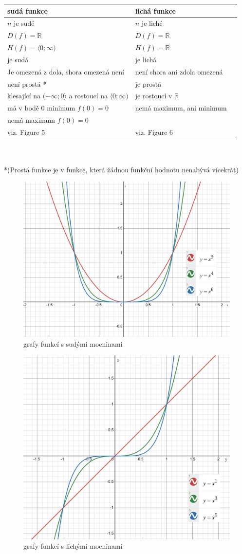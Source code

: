\begin{tabularx}{0.8\textwidth} { 
  | >{\centering\arraybackslash}X 
  | >{\centering\arraybackslash}X 
  | >{\raggedleft\arraybackslash}X | }
 \hline
  \textbf{sudá funkce} & \textbf{lichá funkce}\\
 \hline
 $n$ je sudé      &   $n$ je liché  \\
 \hline
 $D(f)=\mathbb{R}$      &   $D(f) = \mathbb{R}$         \\
 \hline
 $H(f)=\langle0;\infty)$      &   $H(f) = \mathbb{R}$         \\
 \hline
 je sudá      &   je lichá          \\
 \hline
 Je omezená z dola, shora omezená není      &   není shora ani zdola omezená          \\
 \hline
 není prostá *     &   je prostá          \\
 \hline
 klesající na $(-\infty;0\rangle$ a rostoucí na $\langle0;\infty)$      &      je rostoucí v $\mathbb{R}$       \\
 \hline
 má v bodě 0 minimum $f(0) = 0$      &           nemá maximum, ani minimum  \\
\hline
nemá maximum $f(0) = 0$      &             \\
\hline
viz. Figure 5     &    viz. Figure 6         \\
\hline
\end{tabularx} \\ \\
 *(Prostá funkce je v funkce, která žádnou funkční hodnotu nenabývá vícekrát)

\begin{figure}[H]
        \centering
        \includegraphics[width=0.5\linewidth]{img/2_sude_fkce.png}
        \caption{grafy funkcí s sudými mocninami} 
        \label{fig:enter-label}
    \end{figure}

\begin{figure}[H]
        \centering
        \includegraphics[width=0.5\linewidth]{img/2_liche_fkce.png}
        \caption{grafy funkcí s lichými mocninami}
        \label{fig:enter-label}
    \end{figure}

